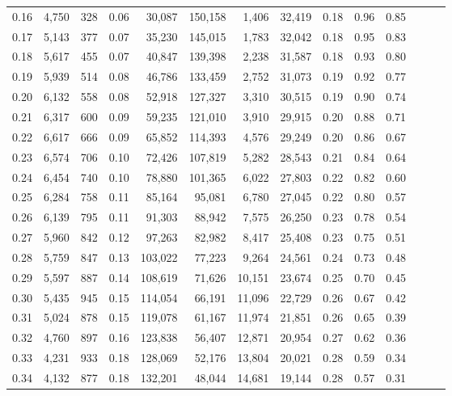 \begin{tabular}{rrrrrrrrrrrrrr}
0.16 &  4,750 &  328 &  0.06 &   30,087 &  150,158 &   1,406 &  32,419 &  0.18 &  0.96 &      0.85 \\
0.17 &  5,143 &  377 &  0.07 &   35,230 &  145,015 &   1,783 &  32,042 &  0.18 &  0.95 &      0.83 \\
0.18 &  5,617 &  455 &  0.07 &   40,847 &  139,398 &   2,238 &  31,587 &  0.18 &  0.93 &      0.80 \\
0.19 &  5,939 &  514 &  0.08 &   46,786 &  133,459 &   2,752 &  31,073 &  0.19 &  0.92 &      0.77 \\
0.20 &  6,132 &  558 &  0.08 &   52,918 &  127,327 &   3,310 &  30,515 &  0.19 &  0.90 &      0.74 \\
0.21 &  6,317 &  600 &  0.09 &   59,235 &  121,010 &   3,910 &  29,915 &  0.20 &  0.88 &      0.71 \\
0.22 &  6,617 &  666 &  0.09 &   65,852 &  114,393 &   4,576 &  29,249 &  0.20 &  0.86 &      0.67 \\
0.23 &  6,574 &  706 &  0.10 &   72,426 &  107,819 &   5,282 &  28,543 &  0.21 &  0.84 &      0.64 \\
0.24 &  6,454 &  740 &  0.10 &   78,880 &  101,365 &   6,022 &  27,803 &  0.22 &  0.82 &      0.60 \\
0.25 &  6,284 &  758 &  0.11 &   85,164 &   95,081 &   6,780 &  27,045 &  0.22 &  0.80 &      0.57 \\
0.26 &  6,139 &  795 &  0.11 &   91,303 &   88,942 &   7,575 &  26,250 &  0.23 &  0.78 &      0.54 \\
0.27 &  5,960 &  842 &  0.12 &   97,263 &   82,982 &   8,417 &  25,408 &  0.23 &  0.75 &      0.51 \\
0.28 &  5,759 &  847 &  0.13 &  103,022 &   77,223 &   9,264 &  24,561 &  0.24 &  0.73 &      0.48 \\
0.29 &  5,597 &  887 &  0.14 &  108,619 &   71,626 &  10,151 &  23,674 &  0.25 &  0.70 &      0.45 \\
0.30 &  5,435 &  945 &  0.15 &  114,054 &   66,191 &  11,096 &  22,729 &  0.26 &  0.67 &      0.42 \\
0.31 &  5,024 &  878 &  0.15 &  119,078 &   61,167 &  11,974 &  21,851 &  0.26 &  0.65 &      0.39 \\
0.32 &  4,760 &  897 &  0.16 &  123,838 &   56,407 &  12,871 &  20,954 &  0.27 &  0.62 &      0.36 \\
0.33 &  4,231 &  933 &  0.18 &  128,069 &   52,176 &  13,804 &  20,021 &  0.28 &  0.59 &      0.34 \\
0.34 &  4,132 &  877 &  0.18 &  132,201 &   48,044 &  14,681 &  19,144 &  0.28 &  0.57 &      0.31 \\

\end{tabular}
